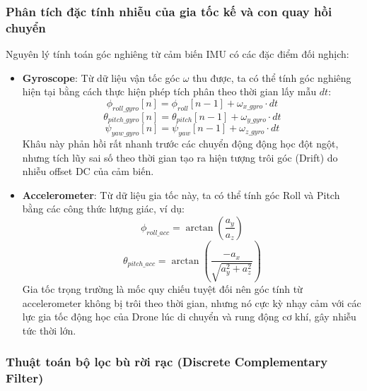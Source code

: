 \subsubsection{Phân tích đặc tính nhiễu của gia tốc kế và con quay hồi chuyển}

Nguyên lý tính toán góc nghiêng từ cảm biến IMU có các đặc điểm đối nghịch:

\begin{itemize}
    \item \textbf{Gyroscope}: Từ dữ liệu vận tốc góc $\omega$ thu được, ta có thể tính góc nghiêng hiện tại bằng cách thực hiện phép tích phân theo thời gian lấy mẫu $dt$:
    \begin{equation}
        \phi_{roll\_gyro}[n] = \phi_{roll}[n-1] + \omega_{x\_gyro} \cdot dt
    \end{equation}
    \begin{equation}
        \theta_{pitch\_gyro}[n] = \theta_{pitch}[n-1] + \omega_{y\_gyro} \cdot dt
    \end{equation}
    \begin{equation}
        \psi_{yaw\_gyro}[n] = \psi_{yaw}[n-1] + \omega_{z\_gyro} \cdot dt
    \end{equation}
    Khâu này phản hồi rất nhanh trước các chuyển động động học đột ngột, nhưng tích lũy sai số theo thời gian tạo ra hiện tượng trôi góc (Drift) do nhiễu offset DC của cảm biến.
    
    \item \textbf{Accelerometer}: Từ dữ liệu gia tốc này, ta có thể tính góc Roll và Pitch bằng các công thức lượng giác, ví dụ:
    \begin{equation}
        \phi_{roll\_acc} = \arctan\left(\frac{a_y}{a_z}\right)
    \end{equation}
    \begin{equation}
        \theta_{pitch\_acc} = \arctan\left(\frac{-a_x}{\sqrt{a_y^2 + a_z^2}}\right)
    \end{equation}
    Gia tốc trọng trường là mốc quy chiếu tuyệt đối nên góc tính từ accelerometer không bị trôi theo thời gian, nhưng nó cực kỳ nhạy cảm với các lực gia tốc động học của Drone lúc di chuyển và rung động cơ khí, gây nhiễu tức thời lớn.
\end{itemize}

\subsubsection{Thuật toán bộ lọc bù rời rạc (Discrete Complementary Filter)}

